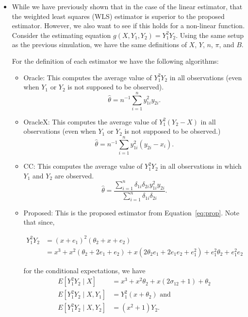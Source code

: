 \documentclass[12pt]{article}
\begin{document}
\begin{itemize}
  \item While we have previously shown that in the case of the linear 
    estimator, that the weighted least squares (WLS) estimator is superior 
    to the proposed estimator. However, we also want to see if this holds 
    for a non-linear function. Consider the estimating equation $g(X, Y_1, Y_2)
     = Y_1^2 Y_2$. Using the same setup as the previous simulation, we have the
     same definitions of $X$, $Y$, $n$, $\pi$, and $B$.

     For the definition of each estimator we have the following algorithms:

     \begin{itemize}
      \item Oracle: This computes the average value of $Y_1^2Y_2$ in all 
        observations (even when $Y_1$ or $Y_2$ is not supposed to be observed).
        \[\hat \theta = n^{-1} \sum_{i = 1}^n y_{1i}^2y_{2i}.\]

      \item OracleX: This computes the average value of $Y_1^2 (Y_2 - X)$ in 
        all observations (even when $Y_1$ or $Y_2$ is not supposed to be observed.)
        \[\hat \theta = n^{-1} \sum_{i = 1}^n y_{1i}^2(y_{2i} - x_i).\]

      \item CC: This computes the average value of $Y_1^2Y_2$ in all
        observations in which $Y_1$ and $Y_2$ are observed.
        \[\hat \theta = \frac{\sum_{i = 1}^n \delta_{1i}\delta_{2i} y_{1i}^2y_{2i}}
        {\sum_{i = 1}^n \delta_{1i}\delta_{2i}}.\]

      \item Proposed: This is the proposed estimator from Equation~\ref{eq:prop}.
        Note that since,

        \begin{align*}
          Y_1^2 Y_2 &= (x + e_1)^2 (\theta_2 + x + e_2) \\ 
                    &= x^3 + x^2 (\theta_2 + 2 e_1 + e_2) 
                    + x(2\theta_2 e_1 + 2 e_1 e_2 + e_1^2) + e_1^2 \theta_2 
                    + e_1^2 e_2
        \end{align*}

        for the conditional expectations, we have
        \begin{align*}
          E[Y_1^2 Y_2 \mid X] &= x^3 + x^2 \theta_2 + x(2\sigma_{12} + 1) + \theta_2\\
          E[Y_1^2 Y_2 \mid X, Y_1] &= Y_1^2 (x + \theta_2) \text{ and }\\
          E[Y_1^2 Y_2 \mid X, Y_2] &= (x^2 + 1) Y_2.
        \end{align*}


\end{itemize}
\end{itemize}
\end{document}
